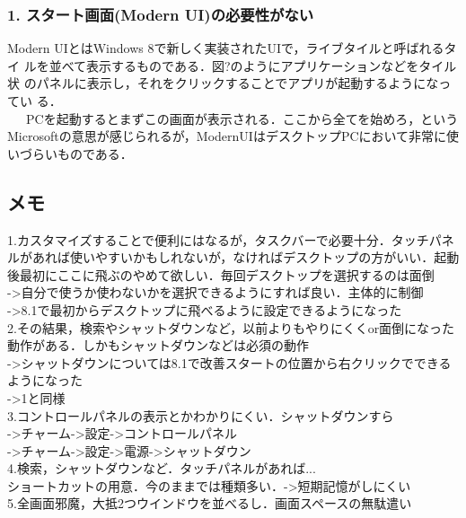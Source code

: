 \documentclass[a4j]{jarticle}
\begin{document}
\subsubsection*{1. スタート画面(Modern UI)の必要性がない}
Modern UIとはWindows 8で新しく実装されたUIで，ライブタイルと呼ばれるタイ
ルを並べて表示するものである．図?のようにアプリケーションなどをタイル状
のパネルに表示し，それをクリックすることでアプリが起動するようになってい
る．\\\ \ \ 
PCを起動するとまずこの画面が表示される．ここから全てを始めろ，という
Microsoftの意思が感じられるが，ModernUIはデスクトップPCにおいて非常に使
いづらいものである．


\subsection*{メモ}
1.カスタマイズすることで便利にはなるが，タスクバーで必要十分．タッチパネ
ルがあれば使いやすいかもしれないが，なければデスクトップの方がいい．起動
後最初にここに飛ぶのやめて欲しい．毎回デスクトップを選択するのは面倒\\
->自分で使うか使わないかを選択できるようにすれば良い．主体的に制御\\
->8.1で最初からデスクトップに飛べるように設定できるようになった\\
2.その結果，検索やシャットダウンなど，以前よりもやりにくくor面倒になった
動作がある．しかもシャットダウンなどは必須の動作\\
->シャットダウンについては8.1で改善スタートの位置から右クリックでできる
ようになった\\
->1と同様\\
3.コントロールパネルの表示とかわかりにくい．シャットダウンすら\\
->チャーム->設定->コントロールパネル\\
->チャーム->設定->電源->シャットダウン\\
4.検索，シャットダウンなど．タッチパネルがあれば...\\
ショートカットの用意．今のままでは種類多い．->短期記憶がしにくい\\
5.全画面邪魔，大抵2つウインドウを並べるし．画面スペースの無駄遣い
\end{document}
